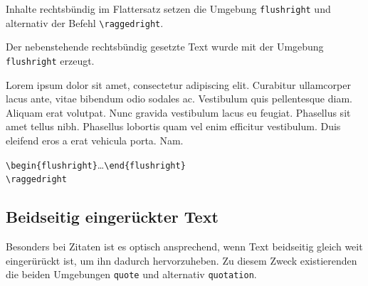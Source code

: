 \documentclass[a4paper,10pt,twoside]{scrbook}
\begin{document}
\begin{minipage}[t]{0.48\textwidth}
\setlength{\parskip}{1em}
\frenchspacing
Inhalte rechtsbündig im Flattersatz setzen die 
Umgebung \verb!flushright! und alternativ der Befehl \verb!\raggedright!.

Der nebenstehende rechtsbündig gesetzte Text wurde mit der Umgebung \verb!flushright! erzeugt.
\end{minipage}
\hfill
\begin{minipage}[t]{0.48\textwidth}
\setlength{\parskip}{1em}
\frenchspacing
\begin{flushright}
Lorem ipsum dolor sit amet, consectetur adipiscing elit. Curabitur ullamcorper lacus ante, vitae bibendum odio sodales ac. Vestibulum quis pellentesque diam. Aliquam erat volutpat. Nunc gravida vestibulum lacus eu feugiat. Phasellus sit amet tellus nibh. Phasellus lobortis quam vel enim efficitur vestibulum. Duis eleifend eros a erat vehicula porta. Nam.
\end{flushright}
\end{minipage}




\begin{boxedminipage}{\textwidth}
\texttt{\textbackslash begin\{flushright\}}\dots\texttt{\textbackslash end\{flushright\}}\\
\texttt{\textbackslash raggedright} 
\end{boxedminipage}



\subsection{Beidseitig eingerückter Text}

Besonders bei Zitaten ist es optisch ansprechend, wenn Text beidseitig gleich weit eingerürückt ist, um ihn dadurch hervorzuheben. Zu diesem Zweck 
existierenden die beiden Umgebungen \verb!quote! und alternativ \verb!quotation!.
\end{document}
